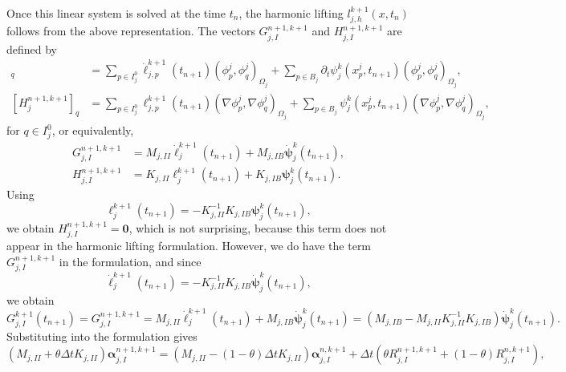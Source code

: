 \documentclass[a4paper, 11pt]{article}
\theoremstyle{remark}
\begin{document}
\begin{enumerate}[label = (\arabic*)]
\begin{equation*}
\end{equation*}
Once this linear system is solved at the time $t_{n}$, the harmonic lifting $l_{j,h}^{k+1}(x,t_n)$ follows from the above representation. The vectors $G^{n+1, k+1}_{j, I}$ and $H^{n+1, k+1}_{j, I}$ are defined by
\begin{align*}
    [G^{n+1, k+1}_{j}]_q &= \sum_{p\in I^{0}_{j}}\dot{\ell}_{j, p}^{k+1}(t_{n+1})(\phi^{j}_{p}, \phi^{j}_{q})_{\Omega_{j}}  + \sum_{p\in B_{j}}\partial_{t}\psi_{j}^{k}(x^{j}_{p}, t_{n+1})(\phi_{p}^{j}, \phi_{q}^{j})_{\Omega_j},\\
    [H^{n+1, k+1}_{j}]_q &= \sum_{p\in I^{0}_{j}}\ell_{j, p}^{k+1}(t_{n+1})(\nabla\phi^{j}_{p}, \nabla\phi^{j}_{q})_{\Omega_{j}}  + \sum_{p\in B_{j}}\psi_{j}^{k}(x^{j}_{p}, t_{n+1})(\nabla\phi_{p}^{j}, \nabla\phi_{q}^{j})_{\Omega_j},
\end{align*}
for $q\in I_{j}^{0}$, or equivalently,
\begin{align*}
    G^{n+1, k+1}_{j, I} &= M_{j, II}\boldsymbol{\dot{\ell}}_{j}^{k+1}(t_{n+1})  + M_{j, IB}\boldsymbol{\dot{\psi}}_{j}^{k}(t_{n+1}),\\
    H^{n+1, k+1}_{j, I} &= K_{j, II}\boldsymbol{\ell}_{j}^{k+1}(t_{n+1})  + K_{j, IB}\boldsymbol{\psi}_{j}^{k}(t_{n+1}).
\end{align*}
Using
\begin{equation*}
    \boldsymbol{\ell}_{j}^{k+1}(t_{n+1}) = - K_{j, II}^{-1}K_{j, IB}\boldsymbol{\psi}_{j}^{k}(t_{n+1}),
\end{equation*}
we obtain $H^{n+1, k+1}_{j, I} = \boldsymbol{0}$, which is not surprising, because this term does not appear in the harmonic lifting formulation. However, we do have the term $G^{n+1, k+1}_{j, I}$ in the formulation, and since 
\begin{equation*}
    \boldsymbol{\dot{\ell}}_{j}^{k+1}(t_{n+1}) = - K_{j, II}^{-1}K_{j, IB}\boldsymbol{\dot{\psi}}_{j}^{k}(t_{n+1}),
\end{equation*}
we obtain
\begin{equation*}
    G^{k+1}_{j, I}(t_{n+1}) = G^{n+1, k+1}_{j, I} = M_{j, II}\boldsymbol{\dot{\ell}}_{j}^{k+1}(t_{n+1})  + M_{j, IB}\boldsymbol{\dot{\psi}}_{j}^{k}(t_{n+1}) = \left(M_{j, IB} - M_{j, II}K_{j, II}^{-1}K_{j, IB}\right)\boldsymbol{\dot{\psi}}_{j}^{k}(t_{n+1}).
\end{equation*}
Substituting into the formulation gives
\begin{equation*}
    \left(M_{j, II} + \theta\Delta t K_{j, II}\right) \boldsymbol{\alpha}_{j, I}^{n+1, k+1} = \left(M_{j, II} - (1-\theta)\Delta t K_{j, II}\right)\boldsymbol{\alpha}_{j, I}^{n, k+1} + \Delta t\left(\theta R^{n+1, k+1}_{j, I} + (1-\theta)R^{n, k+1}_{j, I}\right),

\end{equation*}
\end{enumerate}
\end{document}
